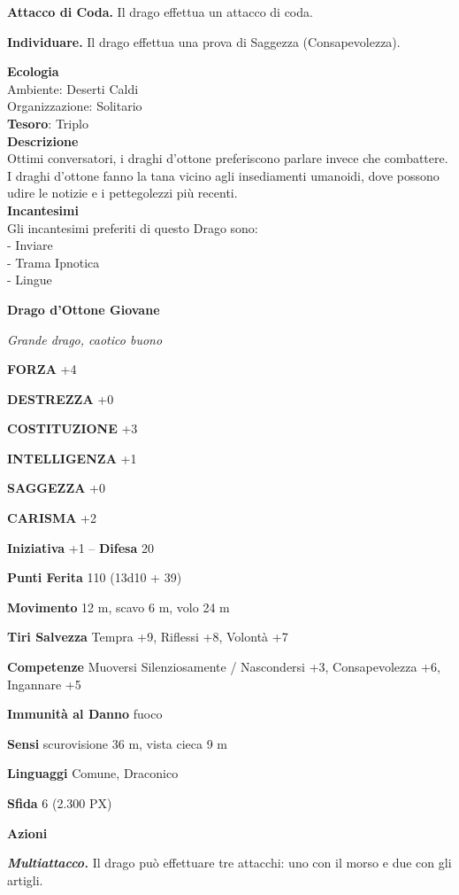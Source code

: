 \begin{multicols}{2}
\textbf{Attacco di Coda.} Il drago effettua un attacco di coda.

\textbf{Individuare.} Il drago effettua una prova di Saggezza (Consapevolezza).

\textbf{Ecologia}\\
Ambiente: Deserti Caldi\\
Organizzazione: Solitario\\
\textbf{Tesoro}: Triplo\\
\textbf{Descrizione}\\
Ottimi conversatori, i draghi d'ottone preferiscono parlare invece che combattere. I draghi d'ottone fanno la tana vicino agli insediamenti umanoidi, dove possono udire le notizie e i pettegolezzi più recenti.\\
\textbf{Incantesimi}\\
Gli incantesimi preferiti di questo Drago sono:\\
- Inviare\\
- Trama Ipnotica\\
- Lingue

\medskip{}\textbf{Drago d'Ottone Giovane}

\textit{Grande drago, caotico buono}

\textbf{FORZA} +4

\textbf{DESTREZZA} +0

\textbf{COSTITUZIONE} +3

\textbf{INTELLIGENZA} +1

\textbf{SAGGEZZA} +0

\textbf{CARISMA} +2

\textbf{Iniziativa} +1 -- \textbf{Difesa} 20

\textbf{Punti Ferita} 110 (13d10 + 39)

\textbf{Movimento} 12 m, scavo 6 m, volo 24 m

\textbf{Tiri Salvezza} Tempra +9, Riflessi +8, Volontà +7

\textbf{Competenze} Muoversi Silenziosamente / Nascondersi +3, Consapevolezza +6, Ingannare +5

\textbf{Immunità al Danno} fuoco

\textbf{Sensi} scurovisione 36 m, vista cieca 9 m

\textbf{Linguaggi} Comune, Draconico

\textbf{Sfida} 6 (2.300 PX)

\textbf{Azioni}

\textit{\textbf{Multiattacco.}} Il drago può effettuare tre attacchi: uno con il morso e due con gli artigli.


\end{multicols}
